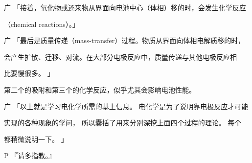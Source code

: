 广 「接着，氧化物或还来物从界面向电池中心（体相）移的时，会发生化学反应\par
（chemical reactions）。」\par
广 「最后是质量传递（mass-transfer）过程。物质从界面向体相电解质移的时，\par
会产生扩散、迁移、对流。在大部分电极反应中，质量传递与其他电极反应相\par
比要慢很多。 」\par
第二个的吸附和第三个的化学反应，似乎尤其会影响电池性能。\par
广 「以上就是学习电化学所需的基上信息。 电化学是为了说明靠电极反应才可能\par
实现的各种现象的学问， 所以囊括了用来分别深挖上面四个过程的理论。 每个\par
都稍微说明一下。 」\par
P 『请多指教。』\par


